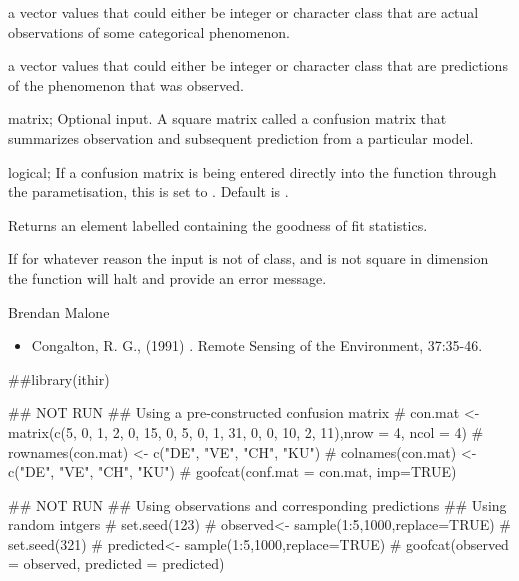 \documentclass[a4paper]{book}
\begin{document}
%
\begin{Arguments}
\begin{ldescription}
\item[\code{observed}] a vector values that could either be integer or character class that are actual observations of some categorical phenomenon.
\item[\code{predicted}] a vector values that could either be integer or character class that are predictions of the phenomenon that was observed.    
\item[\code{conf.mat}] matrix; Optional input. A square matrix called a confusion matrix that summarizes observation and subsequent prediction from a particular model.
\item[\code{imp}] logical; If a confusion matrix is being entered directly into the function through the  parametisation, this is set to . Default is .
\end{ldescription}
\end{Arguments}
%
\begin{Value}
Returns an element labelled  containing the goodness of fit statistics.
\end{Value}
%
\begin{Note}
If for whatever reason the  input is not of  class, and is not square in dimension the function will halt and provide an error message.
\end{Note}
%
\begin{Author}
Brendan Malone
\end{Author}
%
\begin{References}
\begin{itemize}

\item{} Congalton, R. G., (1991) . Remote Sensing of the Environment, 37:35-46.

\end{itemize}
\end{References}
%
\begin{Examples}
\begin{ExampleCode}
##library(ithir)

## NOT RUN
## Using a pre-constructed confusion matrix
# con.mat <- matrix(c(5, 0, 1, 2, 0, 15, 0, 5, 0, 1, 31, 0, 0, 10, 2, 11),nrow = 4, ncol = 4)
# rownames(con.mat) <- c("DE", "VE", "CH", "KU")
# colnames(con.mat) <- c("DE", "VE", "CH", "KU")
# goofcat(conf.mat = con.mat, imp=TRUE)

## NOT RUN
## Using observations and corresponding predictions
## Using random intgers
# set.seed(123)
# observed<- sample(1:5,1000,replace=TRUE)
# set.seed(321)
# predicted<- sample(1:5,1000,replace=TRUE)
# goofcat(observed = observed, predicted = predicted)

\end{ExampleCode}
\end{Examples}
\end{document}
